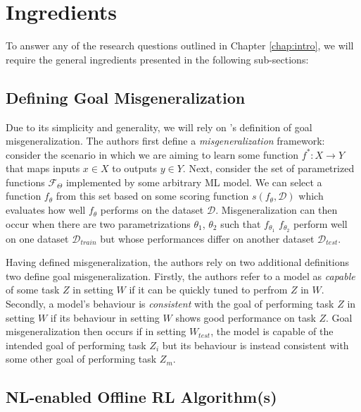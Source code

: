 \documentclass[../thesis-proposal/main.tex]{subfiles}
\begin{document}
\section{Ingredients}

To answer any of the research questions outlined in Chapter \ref{chap:intro}, we will require the
general ingredients presented in the following sub-sections:

\subsection{Defining Goal Misgeneralization}

Due to its simplicity and generality, we will rely on \citet{shah_goal_2022}'s definition of goal
misgeneralization. The authors first define a \textit{misgeneralization} framework: consider the
scenario in which we are aiming to learn some function $f^* : X \rightarrow Y$ that maps inputs $x
	\in X$ to outputs $y \in Y$. Next, consider the set of parametrized functions $\mathcal{F}_\Theta$
implemented by some arbitrary ML model. We can select a function $f_\theta$ from this set based on
some scoring function $s(f_\theta, \mathcal{D})$ which evaluates how well $f_\theta$ performs on the
dataset $\mathcal{D}$. Misgeneralization can then occur when there are two parametrizations
$\theta_1$, $\theta_2$  such that $f_{\theta_1}$ $f_{\theta_2}$ perform well on one dataset
$\mathcal{D}_{train}$ but whose performances differ on another dataset $\mathcal{D}_{test}$.

Having defined misgeneralization, the authors rely on two additional definitions two define goal
misgeneralization. Firstly, the authors refer to a model as \textit{capable} of some task $Z$ in
setting $W$ if it can be quickly tuned to perfrom $Z$ in $W$. Secondly, a model's behaviour is
\textit{consistent} with the goal of performing task $Z$ in setting $W$ if its behaviour in setting
$W$ shows good performance on task $Z$. Goal misgeneralization then occurs if in setting $W_{test}$,
the model is capable of the intended goal of performing task $Z_{i}$ but its behaviour is
instead consistent with some other goal of performing task $Z_{m}$.

\subsection{NL-enabled Offline RL Algorithm(s)}
\end{document}
